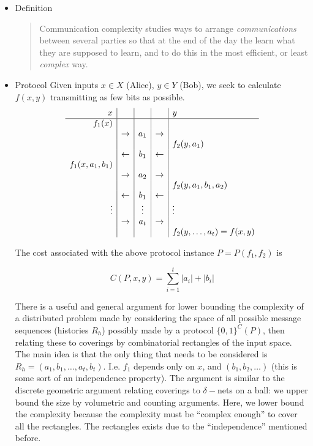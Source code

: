 \documentclass{article}
\begin{document}
\begin{itemize}

\item Definition
    \begin{quote}
        Communication complexity studies ways to arrange {\it communications} between several parties so that at the end of the day the learn what they are supposed to learn, and to do this in the most efficient, or least {\it complex} way.
    \end{quote}

\newcommand{\ra}{\rightarrow}
\newcommand{\la}{\leftarrow}

\item Protocol
    Given inputs $x \in X$ (Alice), $y \in Y$ (Bob), we seek to calculate $f(x,y)$ transmitting as few bits as possible.
    \[
    \begin{array}{r | c | c | c | l}
        x & & & & y \\
        \hline
        f_1(x) &     &     &     &            \\
               & \ra & a_1 & \ra &            \\
               &     &     &     & f_2(y,a_1) \\
               & \la & b_1 & \la &            \\
        f_1(x,a_1,b_1) &     &     &     &    \\
               & \ra & a_2 & \ra &            \\
               &     &     &     & f_2(y,a_1,b_1,a_2) \\
               & \la & b_1 & \la &            \\
        \vdots &     & \vdots    &  & \vdots  \\
               & \ra & a_t & \ra &            \\
               &     &     &     & f_2(y,\dots,a_t) = f(x,y) \\
    \end{array}
    \]

    The cost associated with the above protocol instance $P = P(f_1,f_2)$ is

    \[ C(P,x,y) = \sum_{i=1}^t |a_i| + |b_i| \]

    There is a useful and general argument for lower bounding the complexity of a distributed problem made by considering the space of all possible message sequences (histories $R_h$) possibly made by a protocol $\{0,1\}^C(P)$, then relating these to coverings by combinatorial rectangles of the input space.  The main idea is that the only thing that needs to be considered is $R_h = (a_1,b_1,\dots,a_t,b_t)$.  I.e. $f_1$ depends only on $x$, and $(b_1,b_2,\dots)$ (this is some sort of an independence property).  The argument is similar to the discrete geometric argument relating coverings to $\delta-$nets on a ball: we upper bound the size by volumetric and counting arguments.  Here, we lower bound the complexity because the complexity must be ``complex enough'' to cover all the rectangles.  The rectangles exists due to the ``independence'' mentioned before.

\end{itemize}
\end{document}
